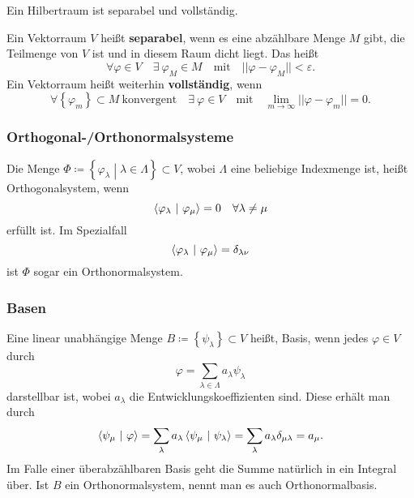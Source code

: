 \documentclass[a4paper,12pt,portrait]{book}
\numberwithin{equation}{section}
\begin{document}
Ein Hilbertraum ist separabel und vollständig. 

Ein Vektorraum $V$ heißt \textbf{separabel}, wenn es eine abzählbare Menge $M$ gibt, die Teilmenge von $V$ ist und in diesem Raum dicht liegt. Das heißt
\begin{equation*}
\forall\varphi\in V\quad\exists\ \varphi_M\in M \quad\text{mit}\quad ||\varphi-\varphi_M||<\varepsilon.
\end{equation*}
Ein Vektorraum heißt weiterhin \textbf{vollständig}, wenn
\begin{equation*}
\forall \left\lbrace\varphi_m\right\rbrace\subset M\ \text{konvergent} \quad\exists\ \varphi\in V \quad\text{mit}\quad\lim\limits_{m\rightarrow\infty}||\varphi-\varphi_m||=0.
\end{equation*}

\subsubsection{Orthogonal-/Orthonormalsysteme}
Die Menge $\Phi\coloneqq\left\lbrace \varphi_\lambda \middle| \lambda\in\Lambda \right\rbrace\subset V$, wobei $\Lambda$ eine beliebige Indexmenge ist, heißt Orthogonalsystem, wenn
\begin{equation*}
\left\langle \varphi_\lambda \ \middle| \ \varphi_\mu\right\rangle=0 \quad\forall\lambda\neq\mu
\end{equation*}
erfüllt ist. Im Spezialfall
\begin{equation*}
\left\langle \varphi_\lambda \ \middle| \ \varphi_\mu\right\rangle=\delta_{\lambda\nu}
\end{equation*}
ist $\Phi$ sogar ein Orthonormalsystem.

\subsubsection{Basen}
Eine linear unabhängige Menge $B\coloneqq\left\lbrace \psi_\lambda\right\rbrace\subset V$ heißt, Basis, wenn jedes $\varphi\in V$ durch 
\begin{equation*}
\varphi= \sum\limits_{\lambda\in\Lambda} a_\lambda \psi_\lambda 
\end{equation*}
darstellbar ist, wobei $a_\lambda$ die Entwicklungskoeffizienten sind. Diese erhält man durch
\begin{equation*}
\left\langle \psi_\mu \ \middle| \ \varphi\right\rangle=\sum\limits_\lambda a_\lambda \left\langle \psi_\mu \ \middle| \ \psi_\lambda\right\rangle=\sum\limits_\lambda a_\lambda\delta_{\mu\lambda}=a_\mu.
\end{equation*}
Im Falle einer überabzählbaren Basis geht die Summe natürlich in ein Integral über. Ist $B$ ein Orthonormalsystem, nennt man es auch Orthonormalbasis.
\end{document}
